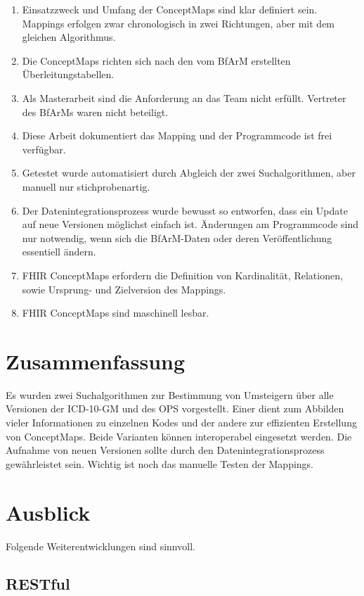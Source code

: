\begin{enumerate}
\item Einsatzzweck und Umfang der ConceptMaps sind klar definiert sein. Mappings erfolgen zwar chronologisch in zwei Richtungen, aber mit dem gleichen Algorithmus.
\item Die ConceptMaps richten sich nach den vom BfArM erstellten Überleitungstabellen.
\item Als Masterarbeit sind die Anforderung an das Team nicht erfüllt. Vertreter des BfArMs waren nicht beteiligt. 
\item Diese Arbeit dokumentiert das Mapping und der Programmcode ist frei verfügbar. 
\item Getestet wurde automatisiert durch Abgleich der zwei Suchalgorithmen, aber manuell nur stichprobenartig.
\item Der Datenintegrationsprozess wurde bewusst so entworfen, dass ein Update auf neue Versionen möglichst einfach ist. Änderungen am Programmcode sind nur notwendig, wenn sich die BfArM-Daten oder deren Veröffentlichung essentiell ändern. 
\item FHIR ConceptMaps erfordern die Definition von Kardinalität, Relationen, sowie Ursprung- und Zielversion des Mappings.
\item FHIR ConceptMaps sind maschinell lesbar.
\end{enumerate}

\section{Zusammenfassung}

Es wurden zwei Suchalgorithmen zur Bestimmung von Umsteigern über alle Versionen der ICD-10-GM und des OPS vorgestellt. Einer dient zum Abbilden vieler Informationen zu einzelnen Kodes und der andere zur effizienten Erstellung von ConceptMaps. Beide Varianten können interoperabel eingesetzt werden. Die Aufnahme von neuen Versionen sollte durch den Datenintegrationsprozess gewährleistet sein. Wichtig ist noch das manuelle Testen der Mappings. 

\newpage

\section{Ausblick}

Folgende Weiterentwicklungen sind sinnvoll.

\subsection{RESTful}


